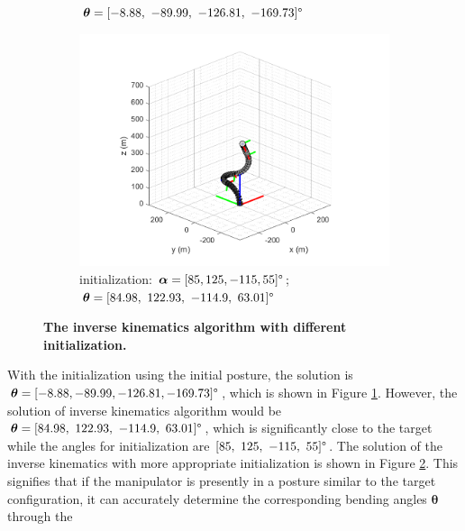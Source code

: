 \begin{figure}[H]
\begin{subfigure}{0.49\textwidth}
{        $\boldsymbol{\theta} = [-8.88,\ -89.99,\ -126.81,\ -169.73]\degree$ }
        \label{fig:complex_init_0_0_0_0}
    \end{subfigure}
    \begin{subfigure}{0.49\textwidth} %
        \centering
        \includegraphics[width=\linewidth]{Image/MATLAB/manipulator_84.98_122.93_-114.9_63.01.png}
        \caption{\centering initialization: $\boldsymbol{\alpha} = [85, 125, -115, 55]\degree$; \\
        $\boldsymbol{\theta} = [84.98,\ 122.93,\ -114.9,\ 63.01]\degree$ }
        \label{fig:complex_init_85_125_-115_55}
    \end{subfigure}
    \caption[The kinematics model of manipulator with respective bending modules]
    {\centering \textbf{The inverse kinematics algorithm with different initialization.}}
    \label{fig:80_120_-120_90_diff_initial}
\end{figure}
\noindent With the initialization using the initial posture, the solution is 
$\boldsymbol{\theta} = [-8.88, -89.99, -126.81, -169.73]\degree$, which is shown in Figure \ref{fig:complex_init_0_0_0_0}. 
However, the solution of inverse kinematics algorithm would be $\boldsymbol{\theta} = [84.98,\ 122.93,\ -114.9,\ 63.01]\degree$, 
which is significantly close to the target while the angles for initialization are $[85,\ 125,\ -115,\ 55]\degree$. 
The solution of the inverse kinematics with more appropriate initialization is shown in Figure 
\ref{fig:complex_init_85_125_-115_55}. This signifies that if the manipulator is presently in a posture similar 
to the target configuration, it can accurately determine the corresponding bending angles $\boldsymbol{\theta}$ through the 
